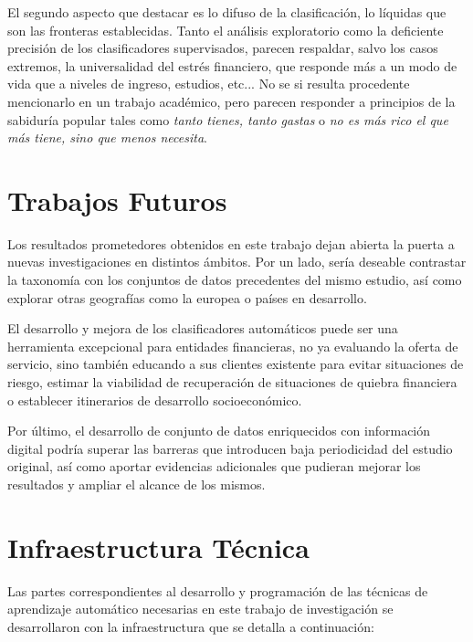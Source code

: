 \documentclass[a4paper, 11pt]{article}
\begin{document}
El segundo aspecto que destacar es lo difuso de la clasificación, lo líquidas que son las 
fronteras establecidas. Tanto el análisis exploratorio como la deficiente precisión de los
clasificadores supervisados, parecen respaldar, salvo los casos extremos, la universalidad 
del estrés financiero, que responde más a un modo de vida que a niveles de ingreso, 
estudios, etc... No se si resulta procedente mencionarlo en un trabajo académico, pero
parecen responder a principios de la sabiduría popular tales como \textit{tanto tienes,
tanto gastas} o \textit{no es más rico el que más tiene, sino que menos necesita}.

\section{Trabajos Futuros}
\label{sec:next_steps}
Los resultados prometedores obtenidos en este trabajo dejan abierta la puerta a 
nuevas investigaciones en distintos ámbitos. Por un lado, sería deseable contrastar
la taxonomía con los conjuntos de datos precedentes del mismo estudio, así como 
explorar otras geografías como la europea o países en desarrollo.

El desarrollo y mejora de los clasificadores automáticos puede ser una herramienta
excepcional para entidades financieras, no ya evaluando la oferta de servicio, sino
también educando a sus clientes existente para evitar situaciones de riesgo, estimar
la viabilidad de recuperación de situaciones de quiebra financiera o establecer 
itinerarios de desarrollo socioeconómico. 

Por último, el desarrollo de conjunto de datos enriquecidos con información digital 
podría superar las barreras que introducen baja periodicidad del estudio original, así
como aportar evidencias adicionales que pudieran mejorar los resultados y ampliar el
alcance de los mismos.

\clearpage
\printbibliography 
\clearpage
\appendix
\section{Infraestructura Técnica}
\label{sec:infrastructure}
Las partes correspondientes al desarrollo y programación de las técnicas
de aprendizaje automático necesarias en este trabajo de investigación se
desarrollaron con la infraestructura que se detalla a continuación:
\end{document}
